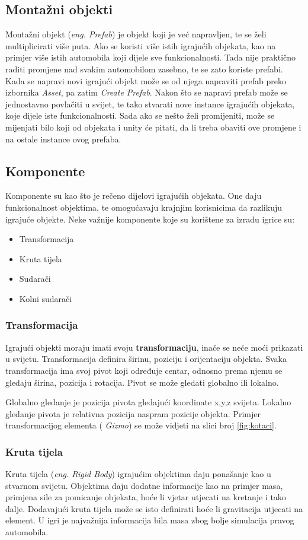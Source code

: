\subsection{Montažni objekti}
Montažni objekt (\emph{eng. Prefab}) je objekt koji je već napravljen, te se želi multiplicirati više puta. Ako se koristi više istih igrajućih objekata, kao na primjer više istih automobila koji dijele sve funkcionalnosti. Tada nije praktično raditi promjene nad svakim automobilom zasebno, te se zato koriste prefabi. Kada se napravi novi igrajući objekt može se od njega napraviti prefab preko izbornika \emph{Asset}, pa zatim \emph{Create Prefab}. Nakon što se napravi prefab može se jednostavno povlačiti u svijet, te tako stvarati nove instance igrajućih objekata, koje dijele iste funkcionalnosti. Sada ako se nešto želi promijeniti, može se mijenjati bilo koji od objekata i unity će pitati, da li treba obaviti ove promjene i na ostale instance ovog prefaba.

\subsection{Komponente}
Komponente su kao što je rečeno dijelovi igrajućih objekata. One daju funkcionalnost objektima, te omogućavaju krajnjim korisnicima da razlikuju igrajuće objekte. Neke važnije komponente koje su korištene za izradu igrice su:
\begin{itemize} 
	\item Transformacija
	\item Kruta tijela
	\item Sudarači
	\item Kolni sudarači 
\end{itemize}
\subsubsection{Transformacija}
Igrajući objekti moraju imati svoju \textbf{transformaciju}, inače se neće moći prikazati u svijetu. Transformacija definira širinu, poziciju i orijentaciju objekta. Svaka transformacija ima svoj pivot koji određuje centar, odnosno prema njemu se gledaju širina, pozicija i rotacija. Pivot se može gledati globalno ili lokalno. \par 
Globalno gledanje je pozicija pivota gledajući koordinate x,y,z svijeta. Lokalno gledanje pivota je relativna pozicija naspram pozicije objekta. Primjer transformacijog elementa (\emph{ Gizmo}) se može vidjeti na slici broj \ref{fig:kotaci}.
\newpage
\subsubsection{Kruta tijela}
Kruta tijela (\emph{eng. Rigid Body}) igrajućim objektima daju ponašanje kao u stvarnom svijetu. Objektima daju dodatne informacije kao na primjer masa, primjena sile za pomicanje objekata, hoće li vjetar utjecati na kretanje i tako dalje. Dodavajući kruta tijela može se isto definirati hoće li gravitacija utjecati na element. U igri je najvažnija informacija bila masa zbog bolje simulacija pravog automobila.
